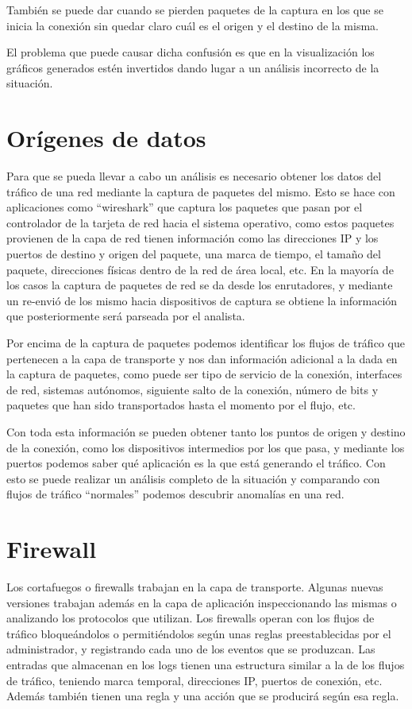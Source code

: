 También se puede dar cuando se pierden paquetes de la captura en los que se inicia la conexión sin quedar claro cuál es el origen y el destino de la misma.
\bigskip

El problema que puede causar dicha confusión es que en la visualización los gráficos generados estén invertidos dando lugar a un análisis incorrecto de la situación.
\bigskip

\section{Orígenes de datos}\cite{ASV}

Para que se pueda llevar a cabo un análisis es necesario obtener los datos del tráfico de una red mediante la captura de paquetes del mismo. Esto se hace con aplicaciones como “wireshark” que captura los paquetes que pasan por el controlador de la tarjeta de red hacia el sistema operativo, como estos paquetes provienen de la capa de red tienen información como las direcciones IP y los puertos de destino y origen del paquete, una marca de tiempo, el tamaño del paquete, direcciones físicas dentro de la red de área local, etc. En la mayoría de los casos la captura de paquetes de red se da desde los enrutadores, y mediante un re-envió de los mismo hacia dispositivos de captura se obtiene la información que posteriormente será parseada por el analista.
\bigskip

Por encima de la captura de paquetes podemos identificar los flujos de tráfico que pertenecen a la capa de transporte y nos dan información adicional a la dada en la captura de paquetes, como puede ser tipo de servicio de la conexión, interfaces de red, sistemas autónomos, siguiente salto de la conexión, número de bits y paquetes que han sido transportados hasta el momento por el flujo, etc.
\bigskip

Con toda esta información se pueden obtener tanto los puntos de origen y destino de la conexión, como los dispositivos intermedios por los que pasa, y mediante los puertos podemos saber qué aplicación es la que está generando el tráfico. Con esto se puede realizar un análisis completo de la situación y comparando con flujos de tráfico “normales” podemos descubrir anomalías en una red.
\bigskip

\section{Firewall}\cite{ASV}
Los cortafuegos o firewalls trabajan en la capa de transporte. Algunas nuevas versiones trabajan además en la capa de aplicación inspeccionando las mismas o analizando los protocolos que utilizan. Los firewalls operan con los flujos de tráfico bloqueándolos o permitiéndolos según unas reglas preestablecidas por el administrador, y registrando cada uno de los eventos que se produzcan. Las entradas que almacenan en los logs tienen una estructura similar a la de los flujos de tráfico, teniendo marca temporal, direcciones IP, puertos de conexión, etc. Además también tienen una regla y una acción que se producirá según esa regla.
\bigskip


